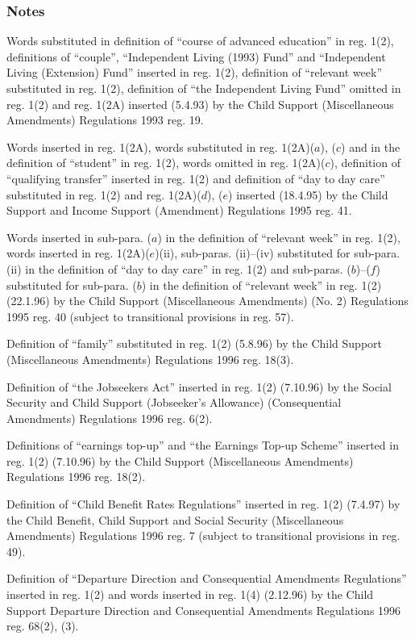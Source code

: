 \documentclass[a4paper]{article}
\newcommand\amendment[1]{\subsubsection*{Notes}{\itshape\frenchspacing\footnotesize #1 \par\goodbreak}}
\begin{document}
\amendment{
\begin{sloppypar}
Words substituted in definition of ``course of advanced education'' in reg. 1(2), definitions of ``couple'', ``Independent Living (1993) Fund'' and ``Independent Living (Extension) Fund'' inserted in reg. 1(2), def\-in\-i\-tion of ``relevant week'' substituted in reg. 1(2), definition of ``the Independent Living Fund'' omitted in reg. 1(2) and reg. 1(2A) inserted (5.4.93) by the Child Support (Miscellaneous Amendments) Regulations 1993 reg. 19.
\end{sloppypar}

Words inserted in reg. 1(2A), words substituted in reg. 1(2A)($a$), ($c$) and in the definition of ``student'' in reg. 1(2), words omitted in reg. 1(2A)($c$), definition of ``qualifying transfer'' inserted in reg. 1(2) and definition of ``day to day care'' substituted in reg. 1(2) and reg. 1(2A)($d$), ($e$) inserted (18.4.95) by the Child Support and Income Support (Amendment) Regulations 1995 reg. 41.

Words inserted in sub-para. ($a$) in the definition of ``relevant week'' in reg. 1(2), words inserted in reg. 1(2A)($e$)(ii), sub-paras. (ii)--(iv) substituted for sub-para. (ii) in the definition of ``day to day care'' in reg. 1(2) and sub-paras. ($b$)--($f$) substituted for sub-para. ($b$) in the definition of ``relevant week'' in reg. 1(2) (22.1.96) by the Child Support (Miscellaneous Amendments) (No. 2) Regulations 1995 reg. 40 (subject to transitional provisions in reg. 57).

Definition of ``family'' substituted in reg. 1(2) (5.8.96) by the Child Support (Miscellaneous Amendments) Regulations 1996 reg. 18(3).

Definition of ``the Jobseekers Act'' inserted in reg. 1(2) (7.10.96) by the Social Security and Child Support (Jobseeker's Allowance) (Consequential Amendments) Regulations 1996 reg. 6(2).

Definitions of ``earnings top-up'' and ``the Earnings Top-up Scheme'' inserted in reg. 1(2) (7.10.96) by the Child Support (Miscellaneous Amendments) Regulations 1996 reg. 18(2).

Definition of ``Child Benefit Rates Regulations'' inserted in reg. 1(2) (7.4.97) by the Child Benefit, Child Support and Social Security (Miscellaneous Amendments) Regulations 1996 reg. 7 (subject to transitional provisions in reg. 49).

Definition of ``Departure Direction and Consequential Amendments Regulations'' inserted in reg. 1(2) and words inserted in reg. 1(4) (2.12.96) by the Child Support Departure Direction and Consequential Amendments Regulations 1996 reg. 68(2), (3).
}
\end{document}
